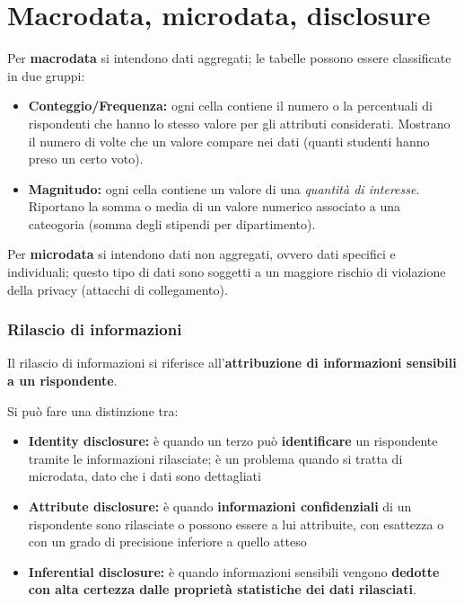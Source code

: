 \documentclass{report}
\begin{document}
\section{Macrodata, microdata, disclosure}
Per \textbf{macrodata} si intendono dati aggregati; le tabelle possono essere classificate in due gruppi:
\begin{itemize}
    \item \textbf{Conteggio/Frequenza:} ogni cella contiene il numero o la percentuali di rispondenti che hanno lo stesso valore per gli attributi considerati.
    Mostrano il numero di volte che un valore compare nei dati (quanti studenti hanno preso un certo voto).
    \item \textbf{Magnitudo:} ogni cella contiene un valore di una \textit{quantità di interesse}. 
    Riportano la somma o media di un valore numerico associato a una cateogoria (somma degli stipendi per dipartimento). 
\end{itemize}

Per \textbf{microdata} si intendono dati non aggregati, ovvero dati specifici e individuali; questo 
tipo di dati sono soggetti a un maggiore rischio di violazione della privacy (attacchi di collegamento).

\subsubsection{Rilascio di informazioni}
Il rilascio di informazioni si riferisce all'\textbf{attribuzione di informazioni sensibili a un rispondente}.

Si può fare una distinzione tra:
\begin{itemize}
    \item \textbf{Identity disclosure:} è quando un terzo può \textbf{identificare} un rispondente tramite le informazioni rilasciate; è un problema
    quando si tratta di microdata, dato che i dati sono dettagliati 
    \item \textbf{Attribute disclosure:} è quando \textbf{informazioni confidenziali} di un rispondente sono 
    rilasciate o possono essere a lui attribuite, con esattezza o con un grado di precisione inferiore a quello atteso 
    \item \textbf{Inferential disclosure:} è quando informazioni sensibili vengono \textbf{dedotte con alta certezza dalle proprietà statistiche dei dati rilasciati}.
\end{itemize}
\end{document}

